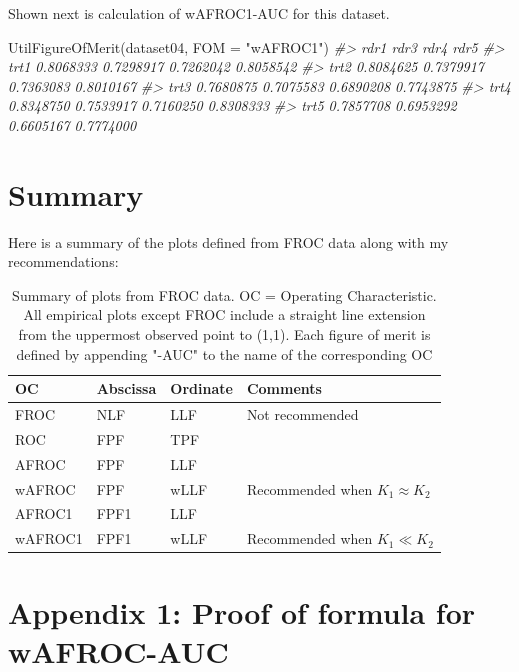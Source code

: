 \documentclass[
]{book}
\newenvironment{Shaded}{\begin{snugshade}}{\end{snugshade}}
\newcommand{\AttributeTok}[1]{\textcolor[rgb]{0.77,0.63,0.00}{#1}}
\newcommand{\CommentTok}[1]{\textcolor[rgb]{0.56,0.35,0.01}{\textit{#1}}}
\newcommand{\FunctionTok}[1]{\textcolor[rgb]{0.00,0.00,0.00}{#1}}
\newcommand{\NormalTok}[1]{#1}
\newcommand{\StringTok}[1]{\textcolor[rgb]{0.31,0.60,0.02}{#1}}
\begin{document}
Shown next is calculation of wAFROC1-AUC for this dataset.

\begin{Shaded}
\begin{Highlighting}[]
\FunctionTok{UtilFigureOfMerit}\NormalTok{(dataset04, }\AttributeTok{FOM =} \StringTok{"wAFROC1"}\NormalTok{)}
\CommentTok{\#\textgreater{}           rdr1      rdr3      rdr4      rdr5}
\CommentTok{\#\textgreater{} trt1 0.8068333 0.7298917 0.7262042 0.8058542}
\CommentTok{\#\textgreater{} trt2 0.8084625 0.7379917 0.7363083 0.8010167}
\CommentTok{\#\textgreater{} trt3 0.7680875 0.7075583 0.6890208 0.7743875}
\CommentTok{\#\textgreater{} trt4 0.8348750 0.7533917 0.7160250 0.8308333}
\CommentTok{\#\textgreater{} trt5 0.7857708 0.6953292 0.6605167 0.7774000}
\end{Highlighting}
\end{Shaded}

\hypertarget{empirical-summary}{%
\section{Summary}\label{empirical-summary}}

Here is a summary of the plots defined from FROC data along with my recommendations:

\begin{table}

\caption{\label{tab:empirical-summary}Summary of plots from FROC data. OC = Operating Characteristic. All empirical plots except FROC include a straight line extension from the uppermost observed point to (1,1). Each figure of merit is defined by appending "-AUC" to the name of the corresponding OC}
\centering
\begin{tabular}[t]{l|l|l|l}
\hline
OC & Abscissa & Ordinate & Comments\\
\hline
FROC & NLF & LLF & Not recommended\\
\hline
ROC & FPF & TPF & \\
\hline
AFROC & FPF & LLF & \\
\hline
wAFROC & FPF & wLLF & Recommended when $K_1 \approx K_2$\\
\hline
AFROC1 & FPF1 & LLF & \\
\hline
wAFROC1 & FPF1 & wLLF & Recommended when $K_1 \ll K_2$\\
\hline
\end{tabular}
\end{table}

\hypertarget{empirical-theorem-1}{%
\section{Appendix 1: Proof of formula for wAFROC-AUC}\label{empirical-theorem-1}}
\end{document}
